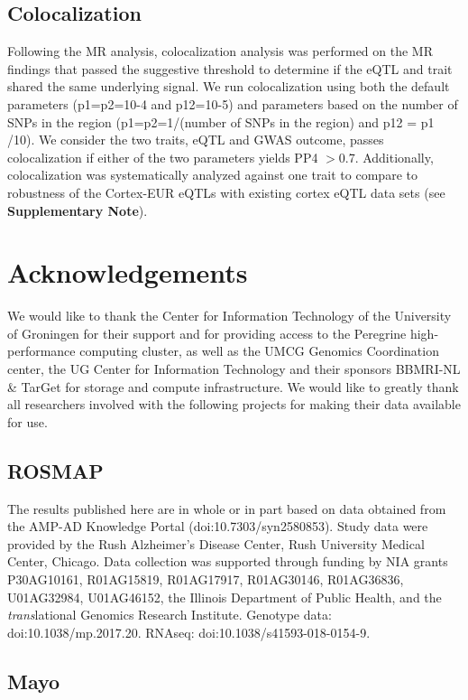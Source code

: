 {\subsection{Colocalization}
Following the MR analysis, colocalization analysis was performed on the MR findings that passed the suggestive threshold to determine if the eQTL and trait shared the same underlying signal. We run colocalization using both the default parameters (p1=p2=10-4 and p12=10-5) and parameters based on the number of SNPs in the region (p1=p2=1/(number of SNPs in the region) and p12 = p1 /10). We consider the two traits, eQTL and GWAS outcome, passes colocalization if either of the two parameters yields PP4 $>$0.7. Additionally, colocalization was systematically analyzed against one trait to compare to robustness of the Cortex-EUR eQTLs with existing cortex eQTL data sets (see \textbf{Supplementary Note}). 


\section*{Acknowledgements}
We would like to thank the Center for Information Technology of the University of Groningen for their support and for providing access to the Peregrine high-performance computing cluster, as well as the UMCG Genomics Coordination center, the UG Center for Information Technology and their sponsors BBMRI-NL \& TarGet for storage and compute infrastructure. We would like to greatly thank all researchers involved with the following projects for making their data available for use. 

\subsection{ROSMAP}

The results published here are in whole or in part based on data obtained from the AMP-AD Knowledge Portal (doi:10.7303/syn2580853). Study data were provided by the Rush Alzheimer’s Disease Center, Rush University Medical Center, Chicago. Data collection was supported through funding by NIA grants P30AG10161, R01AG15819, R01AG17917, R01AG30146, R01AG36836, U01AG32984, U01AG46152, the Illinois Department of Public Health, and the \emph{trans}lational Genomics Research Institute. 
Genotype data: doi:10.1038/mp.2017.20. RNAseq: doi:10.1038/s41593-018-0154-9.  

\subsection{Mayo}

}
